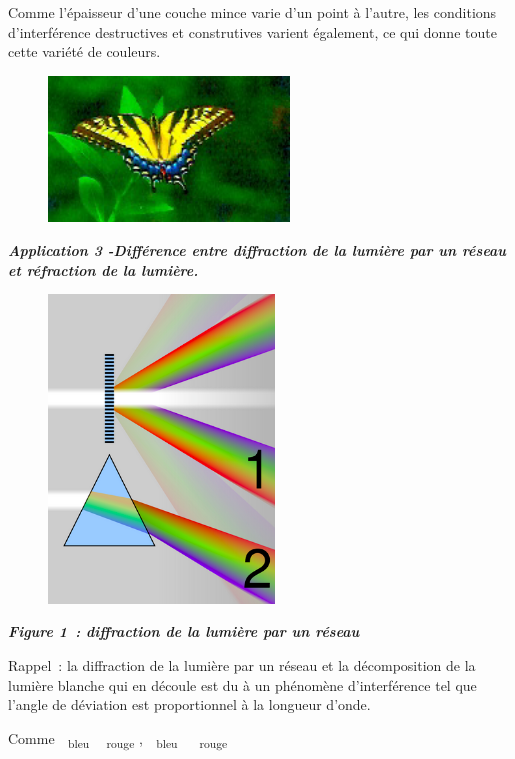 Comme l'épaisseur d'une couche mince varie d'un point à l'autre, les
conditions d'interférence destructives et construtives varient
également, ce qui donne toute cette variété de couleurs.

\begin{figure}
\centering
\includegraphics[width=6.398cm,height=3.881cm]{Pictures/10000001000000B50000006E88C555448F03DCAC.png}
\caption{}
\end{figure}

\emph{\textbf{Application 3 -Différence entre diffraction de la lumière
par un réseau et réfraction de la lumière. }}

\begin{figure}
\centering
\includegraphics[width=6.015cm,height=8.193cm]{Pictures/100000010000015D000001DC81DFB5AA1CFF149A.png}
\caption{}
\end{figure}

\emph{\textbf{Figure 1~: diffraction de la lumière par un réseau}}

Rappel~: la diffraction de la lumière par un réseau et la décomposition
de la lumière blanche qui en découle est du à un phénomène
d'interférence tel que l'angle de déviation est proportionnel à la
longueur d'onde.

Comme \textsubscript{ bleu}  \textsubscript{rouge} , \textsubscript{
bleu}  \textsubscript{ rouge}

